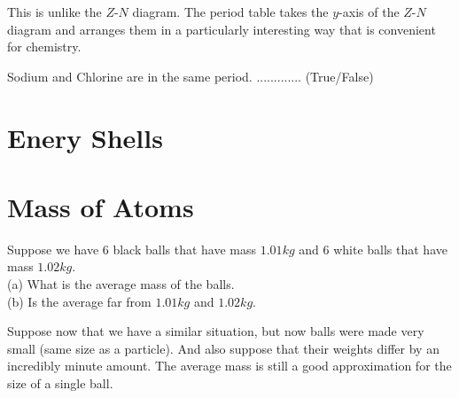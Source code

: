 
This is unlike the $Z$-$N$ diagram. The period table takes 
the $y$-axis of the $Z$-$N$ diagram and arranges them in a particularly interesting 
way that is convenient for chemistry. 








\frmrule 

\begin{example}
Sodium and Chlorine are in the same period. ............. (True/False)
\end{example}



\section{Enery Shells}





\section{Mass of Atoms}


\begin{example}
Suppose we have 6 black balls that have mass $1.01kg$ and 6 white balls that have mass $1.02kg$. \\
(a) What is the average mass of the balls. \\
(b) Is the average far from $1.01kg$ and $1.02kg$. 
\end{example}

\frmrule


Suppose now that we have a similar situation, but now balls were made very small (same size as a particle). 
And also suppose that their weights differ by an incredibly minute amount. 
The average mass is still a good approximation for the size of a single ball. 

\frmrule



